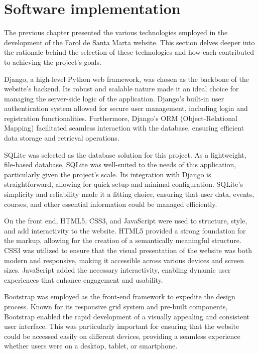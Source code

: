 \section{Software implementation}

The previous chapter presented the various technologies employed in the development of the Farol de Santa Marta website. This section delves deeper into the rationale behind the selection of these technologies and how each contributed to achieving the project’s goals.

Django, a high-level Python web framework, was chosen as the backbone of the website's backend. Its robust and scalable nature made it an ideal choice for managing the server-side logic of the application. Django’s built-in user authentication system allowed for secure user management, including login and registration functionalities. Furthermore, Django's ORM (Object-Relational Mapping) facilitated seamless interaction with the database, ensuring efficient data storage and retrieval operations.

SQLite was selected as the database solution for this project. As a lightweight, file-based database, SQLite was well-suited to the needs of this application, particularly given the project's scale. Its integration with Django is straightforward, allowing for quick setup and minimal configuration. SQLite's simplicity and reliability made it a fitting choice, ensuring that user data, events, courses, and other essential information could be managed efficiently.

On the front end, HTML5, CSS3, and JavaScript were used to structure, style, and add interactivity to the website. HTML5 provided a strong foundation for the markup, allowing for the creation of a semantically meaningful structure. CSS3 was utilized to ensure that the visual presentation of the website was both modern and responsive, making it accessible across various devices and screen sizes. JavaScript added the necessary interactivity, enabling dynamic user experiences that enhance engagement and usability.

Bootstrap was employed as the front-end framework to expedite the design process. Known for its responsive grid system and pre-built components, Bootstrap enabled the rapid development of a visually appealing and consistent user interface. This was particularly important for ensuring that the website could be accessed easily on different devices, providing a seamless experience whether users were on a desktop, tablet, or smartphone.

